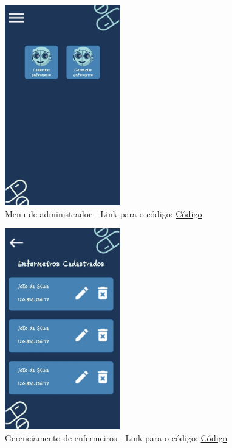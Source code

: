 \begin{apendicesenv}
\begin{figure}[H]
    \centering
    \includegraphics[width=5cm]{figuras/software/telas_frontend/front_AdminMenu.jpg}
    \caption{Menu de administrador - Link para o código: \href{https://github.com/PillWatcher/pillwatcher-dpf-service/blob/dev/components/adminMenu.js}{Código}}
    \label{fig:admin_menu}
\end{figure}

\begin{figure}[H]
    \centering
    \includegraphics[width=5cm]{figuras/software/telas_frontend/front_GerenciarEnfermeirosMenu.jpg}
    \caption{Gerenciamento de enfermeiros - Link para o código: \href{https://github.com/PillWatcher/pillwatcher-dpf-service/blob/dev/components/gerenciarEnfermeirosMenu.js}{Código}}
    \label{fig:gerenciamento_enfermeiros}
\end{figure}


\end{apendicesenv}
